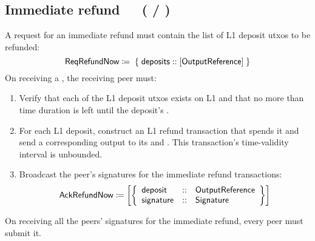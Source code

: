 \documentclass[../hydrozoa.tex]{subfiles}
\begin{document}
\subsection{Immediate refund~~~( / )}%
\label{h:l2-consensus-immediate-refund}%

A request for an immediate refund must contain the list of L1 deposit utxos to be refunded:
\begin{equation*}
  \mathsf{ReqRefundNow} \coloneq \;\{\; \mathsf{deposits} :: [\mathsf{OutputReference}] \;\}
\end{equation*}
On receiving a , the receiving peer must:
\begin{enumerate}
  \item Verify that each of the L1 deposit utxos exists on L1 and that no more than  time duration is left until the deposit's .
  \item For each L1 deposit, construct an L1 refund transaction that spends it and send a corresponding output to its  and .
    This transaction's time-validity interval is unbounded.
  \item Broadcast the peer's signatures for the immediate refund transactions:
    \begin{equation*}
      \mathsf{AckRefundNow} \coloneq \left[\left\{
      \begin{array}{lll}
        \mathsf{deposit} &::& \mathsf{OutputReference} \\
        \mathsf{signature} &::& \mathsf{Signature}
      \end{array}\right\}\right]
    \end{equation*}
\end{enumerate}
On receiving all the peers' signatures for the immediate refund, every peer must submit it.
\end{document}
